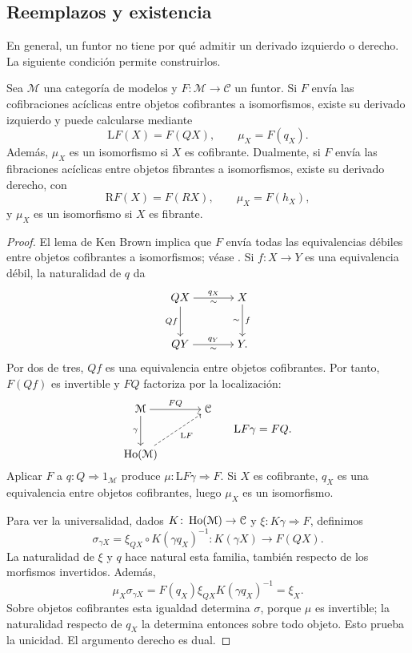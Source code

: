 \subsection{Reemplazos y existencia}

En general, un funtor no tiene por qué admitir un derivado izquierdo o derecho. La siguiente condición permite construirlos.

\begin{prop}\label{prop:c14-existencia-derivados}
Sea $\mathcal M$ una categoría de modelos y $F\colon\mathcal M\to\mathcal C$ un funtor. Si $F$ envía las cofibraciones acíclicas entre objetos cofibrantes a isomorfismos, existe su derivado izquierdo y puede calcularse mediante
\[
\mathrm LF(X)=F(QX),\qquad \mu_X=F(q_X).
\]
Además, $\mu_X$ es un isomorfismo si $X$ es cofibrante. Dualmente, si $F$ envía las fibraciones acíclicas entre objetos fibrantes a isomorfismos, existe su derivado derecho, con
\[
\mathrm RF(X)=F(RX),\qquad \mu_X=F(h_X),
\]
y $\mu_X$ es un isomorfismo si $X$ es fibrante.
\end{prop}
\begin{proof}
El lema de Ken Brown implica que $F$ envía todas las equivalencias débiles entre objetos cofibrantes a isomorfismos; véase \cite[Lema~1.1.12]{hovey1999}. Si $f\colon X\to Y$ es una equivalencia débil, la naturalidad de $q$ da
\[
\begin{tikzcd}[cramped,column sep=large,row sep=large]
QX \arrow[r,"q_X","\sim"'] \arrow[d,"Qf"'] & X \arrow[d,"f","\sim"']\\
QY \arrow[r,"q_Y","\sim"'] & Y.
\end{tikzcd}
\]
Por dos de tres, $Qf$ es una equivalencia entre objetos cofibrantes. Por tanto, $F(Qf)$ es invertible y $FQ$ factoriza por la localización:
\[
\begin{tikzcd}[cramped,column sep=large,row sep=large]
\mathcal M \arrow[r,"FQ"] \arrow[d,"\gamma"'] & \mathcal C\\
\Ho(\mathcal M) \arrow[ur,dashed,"\mathrm LF"'] &
\end{tikzcd}
\qquad \mathrm LF\gamma=FQ.
\]
Aplicar $F$ a $q\colon Q\Rightarrow1_{\mathcal M}$ produce $\mu\colon\mathrm LF\gamma\Rightarrow F$. Si $X$ es cofibrante, $q_X$ es una equivalencia entre objetos cofibrantes, luego $\mu_X$ es un isomorfismo.

Para ver la universalidad, dados $K\colon\operatorname{Ho}(\mathcal M)\to\mathcal C$ y $\xi\colon K\gamma\Rightarrow F$, definimos
\[
\sigma_{\gamma X}
=\xi_{QX}\circ K(\gamma q_X)^{-1}\colon
K(\gamma X)\longrightarrow F(QX).
\]
La naturalidad de $\xi$ y $q$ hace natural esta familia, también respecto de los morfismos invertidos. Además,
\[
\mu_X\sigma_{\gamma X}
=F(q_X)\xi_{QX}K(\gamma q_X)^{-1}=\xi_X.
\]
Sobre objetos cofibrantes esta igualdad determina $\sigma$, porque $\mu$ es invertible; la naturalidad respecto de $q_X$ la determina entonces sobre todo objeto. Esto prueba la unicidad. El argumento derecho es dual.
\end{proof}

